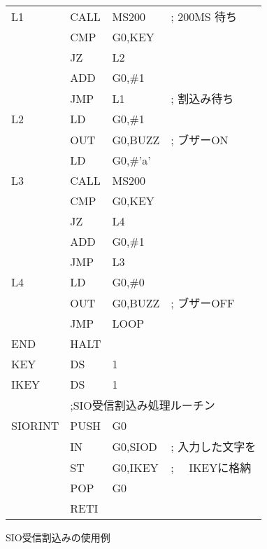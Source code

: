 \begin{figure}[btp]
{\begin{center}
\begin{tabular}{|l|l l l|}
L1      & CALL    & MS200          & ; 200MS 待ち\\
        & CMP     & G0,KEY         & \\
        & JZ      & L2             & \\
        & ADD     & G0,\#1         & \\
        & JMP     & L1             & ; 割込み待ち\\
L2      & LD      & G0,\#1         & \\
        & OUT     & G0,BUZZ        & ; ブザーON\\
        & LD      & G0,\#'a'       & \\
L3      & CALL    & MS200          & \\
        & CMP     & G0,KEY         & \\
        & JZ      & L4             & \\
        & ADD     & G0,\#1         & \\
        & JMP     & L3             & \\
L4      & LD      & G0,\#0         & \\
        & OUT     & G0,BUZZ        & ; ブザーOFF\\
        & JMP     & LOOP           & \\
END     & HALT    &                & \\
KEY     & DS      & 1              & \\
IKEY    & DS      & 1              & \\
        & \multicolumn{3}{|l|}{;SIO受信割込み処理ルーチン} \\
SIORINT & PUSH    & G0             & \\
        & IN      & G0,SIOD        & ; 入力した文字を\\
        & ST      & G0,IKEY        & ; 　IKEYに格納\\
        & POP     & G0             & \\
        & RETI    &                & \\
\hline
\end{tabular}
\end{center}}
\caption{SIO受信割込みの使用例}
\label{fig:chap6:sioin}
\end{figure}

